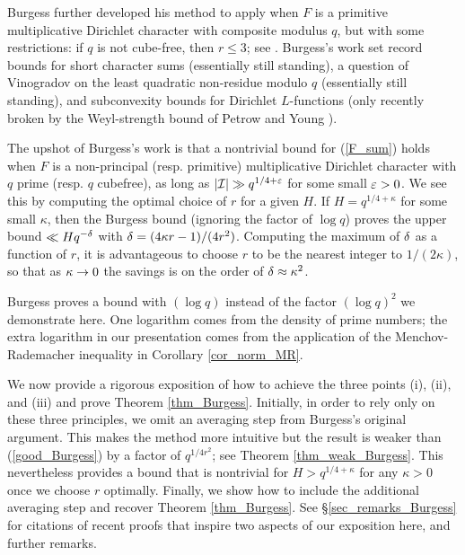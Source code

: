 \documentclass[oneside,11pt]{amsart}
\begin{document}
Burgess further developed his method to apply when $F$ is a primitive multiplicative Dirichlet character with composite modulus $q$, but with some restrictions:  if $q$ is not cube-free, then  $ r \leq 3$; see \cite{Bur62B, Bur63A, Bur86}. Burgess's work set  record bounds for short character sums (essentially still standing), a question of Vinogradov on the least quadratic non-residue modulo $q$ \cite{Vin27} (essentially still standing), and subconvexity bounds for Dirichlet $L$-functions (only recently broken by the Weyl-strength bound of Petrow and Young \cite{PetYou19x}). 




The upshot of Burgess's work is that a nontrivial bound for (\ref{F_sum})  holds when $F$ is a non-principal (resp. primitive) multiplicative Dirichlet character with $q$ prime (resp. $q$ cubefree), as long as $|\mathcal{I}| \gg q^{1/4+\varepsilon}$ for some small $\varepsilon>0$. We see this by computing the optimal choice of $r$ for a given $H$. If $H = q^{1/4+\kappa}$ for some small $\kappa$, then the Burgess bound (ignoring the factor of $\log q$) proves the upper bound $\ll Hq^{-\delta}$ with $\delta = (4\kappa r-1)/(4r^2)$. Computing the maximum of $\delta$ as a function of $r$, it is advantageous to choose $r$ to be the nearest integer to $1/(2\kappa)$, so that as $\kappa \rightarrow 0$ the savings is on the order of $\delta \approx \kappa^2$. 

 \begin{remark} Burgess proves a bound with $(\log q)$ instead of the factor $(\log q)^2$   we demonstrate here. One logarithm comes from the density of prime numbers; the  extra logarithm in our presentation comes from the application of the Menchov-Rademacher inequality in Corollary \ref{cor_norm_MR}.
\end{remark}


 
We now provide a rigorous exposition of how to achieve the three points (i), (ii), and (iii) and prove Theorem \ref{thm_Burgess}.
Initially, in order to rely only on these three  principles, we  omit an averaging step from Burgess's original argument. This makes the method   more intuitive but the result is weaker than (\ref{good_Burgess}) by a factor of $q^{1/4r^2}$; see  Theorem \ref{thm_weak_Burgess}. This nevertheless provides a bound that is nontrivial for $H> q^{1/4+\kappa}$ for any $\kappa>0$ once we choose $r$ optimally.
 Finally, we show how to include the additional averaging step and recover  Theorem \ref{thm_Burgess}.
See \S \ref{sec_remarks_Burgess} for citations of recent proofs that inspire two aspects of our exposition here, and    further remarks.
\end{document}
